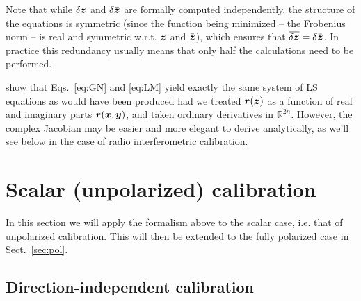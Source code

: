 \documentclass[useAMS,usenatbib]{mn2e}
\newcommand{\REAL}{\mathbb{R}}
\newcommand{\zz}{\bmath{z}}
\newcommand{\rr}{\bmath{r}}
\numberwithin{equation}{section}
\begin{document}
Note that while $\delta\zz$ and $\delta \bar{\zz}$ are formally computed independently, the structure of the equations 
is symmetric (since the function being minimized -- the Frobenius norm -- is real and symmetric w.r.t. $\zz$ and $\bar{\zz}$),
which ensures that $\overline{\delta\zz} = \delta \bar{\zz}$. In practice this  redundancy usually means that only half the calculations need to be performed.

\citet{ComplexOpt} show that Eqs.~\ref{eq:GN} and \ref{eq:LM} yield exactly the same system of LS equations as would have 
been produced had we treated $\rr(\zz)$ as a function of real and imaginary parts $\rr(\bmath{x},\bmath{y})$, 
and taken ordinary derivatives in $\REAL^{2n}$. However, the complex Jacobian may be easier and more elegant 
to derive analytically, as we'll see below in the case of radio interferometric calibration.

\section{Scalar (unpolarized) calibration}
\label{sec:unpol}

In this section we will apply the formalism above to the scalar case, i.e. that of unpolarized calibration. 
This will then be extended to the fully polarized case in Sect.~\ref{sec:pol}.

\subsection{Direction-independent calibration}
\label{sec:unpol:DI}

\newcommand{\Na}{N_\mathrm{ant}}
\newcommand{\Nbl}{N_\mathrm{bl}}
\newcommand{\Nd}{N_\mathrm{dir}}
\end{document}
